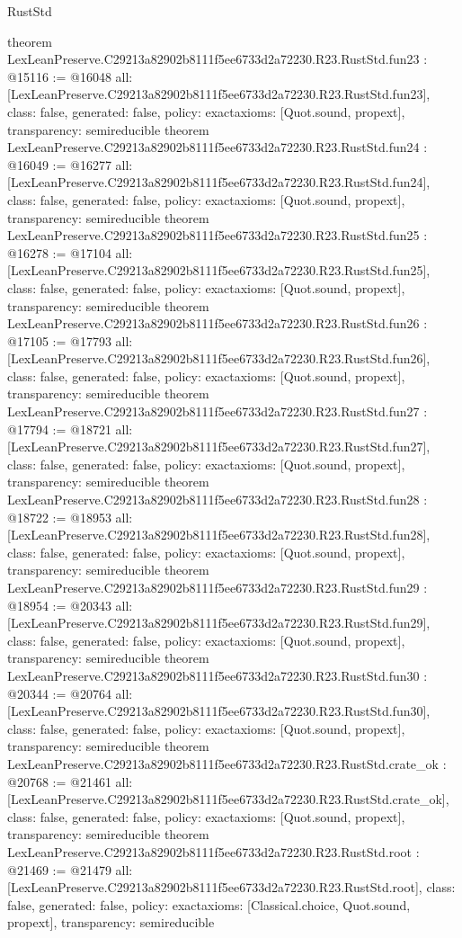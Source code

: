 \begin{lexlean}{RustStd}
\begin{coremodule}
{}
theorem LexLeanPreserve.C29213a82902b8111f5ee6733d2a72230.R23.RustStd.fun23 : @15116 := @16048 {
  all: [LexLeanPreserve.C29213a82902b8111f5ee6733d2a72230.R23.RustStd.fun23],
  class: false,
  generated: false,
  policy: exact{axioms: [Quot.sound, propext]},
  transparency: semireducible
}
theorem LexLeanPreserve.C29213a82902b8111f5ee6733d2a72230.R23.RustStd.fun24 : @16049 := @16277 {
  all: [LexLeanPreserve.C29213a82902b8111f5ee6733d2a72230.R23.RustStd.fun24],
  class: false,
  generated: false,
  policy: exact{axioms: [Quot.sound, propext]},
  transparency: semireducible
}
theorem LexLeanPreserve.C29213a82902b8111f5ee6733d2a72230.R23.RustStd.fun25 : @16278 := @17104 {
  all: [LexLeanPreserve.C29213a82902b8111f5ee6733d2a72230.R23.RustStd.fun25],
  class: false,
  generated: false,
  policy: exact{axioms: [Quot.sound, propext]},
  transparency: semireducible
}
theorem LexLeanPreserve.C29213a82902b8111f5ee6733d2a72230.R23.RustStd.fun26 : @17105 := @17793 {
  all: [LexLeanPreserve.C29213a82902b8111f5ee6733d2a72230.R23.RustStd.fun26],
  class: false,
  generated: false,
  policy: exact{axioms: [Quot.sound, propext]},
  transparency: semireducible
}
theorem LexLeanPreserve.C29213a82902b8111f5ee6733d2a72230.R23.RustStd.fun27 : @17794 := @18721 {
  all: [LexLeanPreserve.C29213a82902b8111f5ee6733d2a72230.R23.RustStd.fun27],
  class: false,
  generated: false,
  policy: exact{axioms: [Quot.sound, propext]},
  transparency: semireducible
}
theorem LexLeanPreserve.C29213a82902b8111f5ee6733d2a72230.R23.RustStd.fun28 : @18722 := @18953 {
  all: [LexLeanPreserve.C29213a82902b8111f5ee6733d2a72230.R23.RustStd.fun28],
  class: false,
  generated: false,
  policy: exact{axioms: [Quot.sound, propext]},
  transparency: semireducible
}
theorem LexLeanPreserve.C29213a82902b8111f5ee6733d2a72230.R23.RustStd.fun29 : @18954 := @20343 {
  all: [LexLeanPreserve.C29213a82902b8111f5ee6733d2a72230.R23.RustStd.fun29],
  class: false,
  generated: false,
  policy: exact{axioms: [Quot.sound, propext]},
  transparency: semireducible
}
theorem LexLeanPreserve.C29213a82902b8111f5ee6733d2a72230.R23.RustStd.fun30 : @20344 := @20764 {
  all: [LexLeanPreserve.C29213a82902b8111f5ee6733d2a72230.R23.RustStd.fun30],
  class: false,
  generated: false,
  policy: exact{axioms: [Quot.sound, propext]},
  transparency: semireducible
}
theorem LexLeanPreserve.C29213a82902b8111f5ee6733d2a72230.R23.RustStd.crate_ok : @20768 := @21461 {
  all: [LexLeanPreserve.C29213a82902b8111f5ee6733d2a72230.R23.RustStd.crate_ok],
  class: false,
  generated: false,
  policy: exact{axioms: [Quot.sound, propext]},
  transparency: semireducible
}
theorem LexLeanPreserve.C29213a82902b8111f5ee6733d2a72230.R23.RustStd.root : @21469 := @21479 {
  all: [LexLeanPreserve.C29213a82902b8111f5ee6733d2a72230.R23.RustStd.root],
  class: false,
  generated: false,
  policy: exact{axioms: [Classical.choice, Quot.sound, propext]},
  transparency: semireducible
}


\end{coremodule}
\end{lexlean}
